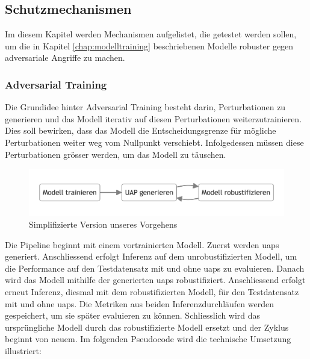\subsection{Schutzmechanismen}

Im diesem Kapitel werden Mechanismen aufgelistet, die getestet werden sollen, um die in Kapitel \ref{chap:modelltraining} beschriebenen Modelle robuster gegen  adversariale Angriffe zu machen.

\subsubsection{Adversarial Training} \label{chap:adversarial training}

Die Grundidee hinter Adversarial Training besteht darin, Perturbationen zu generieren und das Modell iterativ auf diesen Perturbationen weiterzutrainieren. Dies soll bewirken, dass das Modell die Entscheidungsgrenze für mögliche Perturbationen weiter weg vom Nullpunkt verschiebt. Infolgedessen müssen diese Perturbationen grösser werden, um das Modell zu täuschen.

\begin{figure}[H]
    \centering
    \includegraphics[width=\linewidth]{01-images/04-methodik/simplified_overview.png}
    \caption{Simplifizierte Version unseres Vorgehens}
    \label{fig:07-simplified_overview}
\end{figure}

Die Pipeline beginnt mit einem vortrainierten Modell. Zuerst werden \acrshort{uap}s generiert. Anschliessend erfolgt Inferenz auf dem unrobustifizierten Modell, um die Performance auf den Testdatensatz mit und ohne \acrshort{uap}s zu evaluieren. Danach wird das Modell mithilfe der generierten \acrshort{uap}s robustifiziert. Anschliessend erfolgt erneut Inferenz, diesmal mit dem robustifizierten Modell, für den Testdatensatz mit und ohne \acrshort{uap}s. Die Metriken aus beiden Inferenzdurchläufen werden gespeichert, um sie später evaluieren zu können. Schliesslich wird das ursprüngliche Modell durch das robustifizierte Modell ersetzt und der Zyklus beginnt von neuem. Im folgenden Pseudocode wird die technische Umsetzung illustriert:

